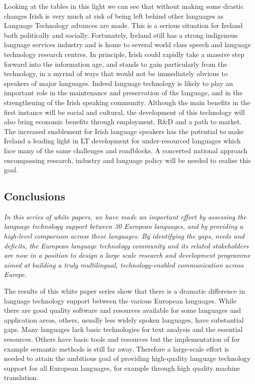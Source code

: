 \begin{multicols}{2}
Looking at the tables in this light we can see that without making some drastic changes Irish is very much at risk of being left behind other languages as Language Technology advances are made. This is a serious situation for Ireland both politically and socially. Fortunately, Ireland still has a strong indigenous language services industry and is home to several world class speech and language technology research centres. In principle, Irish could rapidly take a massive step forward into the information age, and stands to gain particularly from the technology, in a myriad of ways that would not be immediately obvious to speakers of major languages. Indeed language technology is likely to play an important role in the maintenance and preservation of the language, and in the strengthening of the Irish speaking community. Although the main benefits in the first instance will be social and cultural, the development of this technology will also bring economic benefits through employment, R\&D and a path to market. The increased enablement for Irish language speakers has the potential to make Ireland a leading light in LT development for under-resourced languages which face many of the same challenges and roadblocks. A concerted national approach encompassing research, industry and language policy will be needed to realise this goal.


\subsection{Conclusions}

\emph{In this series of white papers, we have made an important effort by assessing the language technology support between 30 European languages, and by providing a high-level comparison across these languages. By identifying the gaps, needs and deficits, the European language technology community and its related stakeholders are now in a position to design a large scale research and development programme aimed at building a truly multilingual, technology-enabled communication across Europe.}

The results of this white paper series show that there is a dramatic difference in language technology support between the various European languages. While there are good quality software and resources available for some languages and application areas, others, usually less widely spoken languages, have substantial gaps. Many languages lack basic technologies for text analysis and the essential resources. Others have basic tools and resources but the implementation of for example semantic methods is still far away. Therefore a large-scale effort is needed to attain the ambitious goal of providing high-quality language technology support for all European languages, for example through high quality machine translation. 


\end{multicols}
